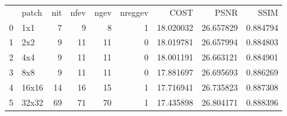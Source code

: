 \begin{tabular}{llrrrrrrr}
 & patch & nit & nfev & ngev & nreggev & COST & PSNR & SSIM \\
0 & 1x1 & 7 & 9 & 8 & 1 & 18.020032 & 26.657829 & 0.884794 \\
1 & 2x2 & 9 & 11 & 11 & 0 & 18.019781 & 26.657994 & 0.884803 \\
2 & 4x4 & 9 & 11 & 11 & 0 & 18.001191 & 26.663121 & 0.884901 \\
3 & 8x8 & 9 & 11 & 11 & 0 & 17.881697 & 26.695693 & 0.886269 \\
4 & 16x16 & 14 & 16 & 15 & 1 & 17.716941 & 26.735823 & 0.887308 \\
5 & 32x32 & 69 & 71 & 70 & 1 & 17.435898 & 26.804171 & 0.888396 \\
\end{tabular}

